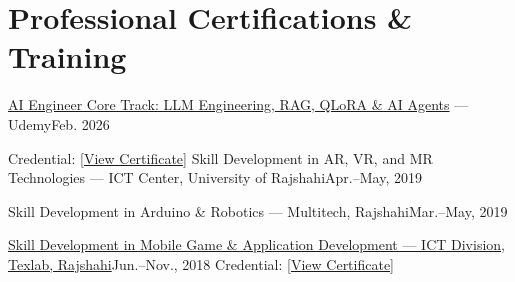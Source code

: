 \section{Professional Certifications \& Training}
\cvSubHeadingListStart

\cvSubSubheading
{\href{https://www.udemy.com/certificate/UC-3669de15-e4f0-4149-9ea4-eb49a369f5d9/}
{AI Engineer Core Track: LLM Engineering, RAG, QLoRA \& AI Agents} --- Udemy}{Feb. 2026}

{\footnotesize
Credential:
\href{https://www.udemy.com/certificate/UC-3669de15-e4f0-4149-9ea4-eb49a369f5d9/}
{[View Certificate]}
}
\cvSubSubheading
{Skill Development in AR, VR, and MR Technologies --- ICT Center, University of Rajshahi}{Apr.--May, 2019}

\cvSubSubheading
{Skill Development in Arduino \& Robotics --- Multitech, Rajshahi}{Mar.--May, 2019}

\cvSubSubheading
{\href{https://drive.google.com/file/d/1AY46OgCrBG35vaSyF2g0_Ka050UR7LMH/view?usp=sharing}
{Skill Development in Mobile Game \& Application Development --- ICT Division, Texlab, Rajshahi}}{Jun.--Nov., 2018}
{\footnotesize
Credential:
\href{https://drive.google.com/file/d/1AY46OgCrBG35vaSyF2g0_Ka050UR7LMH/view?usp=sharing}
{[View Certificate]}
}

\vspace{5pt}
\cvSubHeadingListEnd